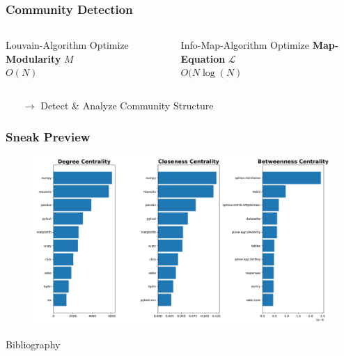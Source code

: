 \documentclass[fleqn]{beamer}
\begin{document}
    \begin{frame}
        \frametitle{Community Detection}
        \begin{columns}[T]
        \begin{block}{\centering Louvain-Algorithm}
            \centering
            Optimize \textbf{Modularity} $M$\\
            $O(N)$
        \end{block}
        \begin{block}{\centering Info-Map-Algorithm}
            \centering
            Optimize \textbf{Map-Equation} $\mathcal{L}$\\
            $O(N\log(N)$
        \end{block}
        \end{columns}
        \vspace{1cm}
        \begin{itemize}
            \item[$\to$]\centering Detect \& Analyze Community Structure
        \end{itemize}
    \end{frame}

    \begin{frame}
        \frametitle{Sneak Preview}
        \begin{figure}[htpb]
            \centering
            \includegraphics[width=1\textwidth]{./pics/sneak_peak.png}
            \label{fig:-frac-pics-sneap_peak-png}
        \end{figure}
    \end{frame}

    \begin{frame}{Bibliography}
        \nocite{barabasi}
        \nocite{motivation}
        \nocite{pypi}
        \printbibliography
    \end{frame}
\end{document}
